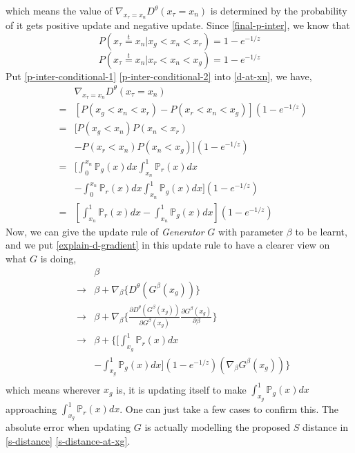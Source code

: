 \documentclass[letterpaper]{article} %
\begin{document}
which means the value of $\nabla_{x_{\tau}=x_n} D^{\theta}(x_{\tau}=x_n)$ is determined by the probability of it gets positive update and negative update.
Since \eqref{final-p-inter}, we know that
\begin{equation}\label{p-inter-conditional-1}
  P(x_\tau\overset{t}{=}x_n|x_g<x_n<x_r)=1 - e^{-1/z}
\end{equation}
\begin{equation}\label{p-inter-conditional-2}
  P(x_\tau\overset{t}{=}x_n|x_r<x_n<x_g)=1 - e^{-1/z}
\end{equation}
Put \eqref{p-inter-conditional-1} \eqref{p-inter-conditional-2} into \eqref{d-at-xn}, we have,
\begin{eqnarray}\label{explain-d-gradient}
    && \nabla_{x_{\tau}=x_n} D^{\theta}(x_{\tau}=x_n) \nonumber\\
    &=& [P(x_g<x_n<x_r) - P(x_r<x_n<x_g)](1 - e^{-1/z}) \nonumber\\
    &=& [P(x_g<x_n)P(x_n<x_r) \nonumber\\
    && - P(x_r<x_n)P(x_n<x_g)](1 - e^{-1/z}) \nonumber\\
    &=& [\int_{0}^{x_n}\mathbb{P}_g(x)dx \int_{x_n}^{1}\mathbb{P}_r(x)dx \nonumber\\
    && - \int_{0}^{x_n}\mathbb{P}_r(x)dx \int_{x_n}^{1}\mathbb{P}_g(x)dx](1 - e^{-1/z}) \nonumber\\
    &=& [\int_{x_n}^{1}\mathbb{P}_r(x)dx-\int_{x_n}^{1}\mathbb{P}_g(x)dx](1 - e^{-1/z})
\end{eqnarray}
Now, we can give the update rule of \textit{Generator} $G$ with parameter $\beta$ to be learnt, and we put \eqref{explain-d-gradient} in this update rule to have a clearer view on what $G$ is doing,
\begin{eqnarray}\label{g-loss}
  && \beta \nonumber\\
  & \longrightarrow & \beta + \nabla_{\beta} \{ D^{\theta}(G^{\beta}(x_g)) \} \nonumber\\
  & \longrightarrow & \beta + \nabla_{\beta} \{ \frac{\partial D^{\theta}(G^{\beta}(x_g))}{\partial G^{\beta}(x_g)} \frac{\partial G^{\beta}(x_g)}{\partial \beta} \} \nonumber\\
  & \longrightarrow & \beta + \{[\int_{x_g}^{1}\mathbb{P}_r(x)dx\nonumber\\
  && -\int_{x_g}^{1}\mathbb{P}_g(x)dx](1 - e^{-1/z})(\nabla_{\beta}G^{\beta}(x_g)) \} \nonumber\\
\end{eqnarray}
which means wherever $x_g$ is, it is updating itself to make $\int_{x_g}^{1}\mathbb{P}_g(x)dx$ approaching $\int_{x_g}^{1}\mathbb{P}_r(x)dx$.
One can just take a few cases to confirm this.
The absolute error when updating $G$ is actually modelling the proposed $S$ distance in \eqref{s-distance} \eqref{s-distance-at-xg}.
\end{document}
